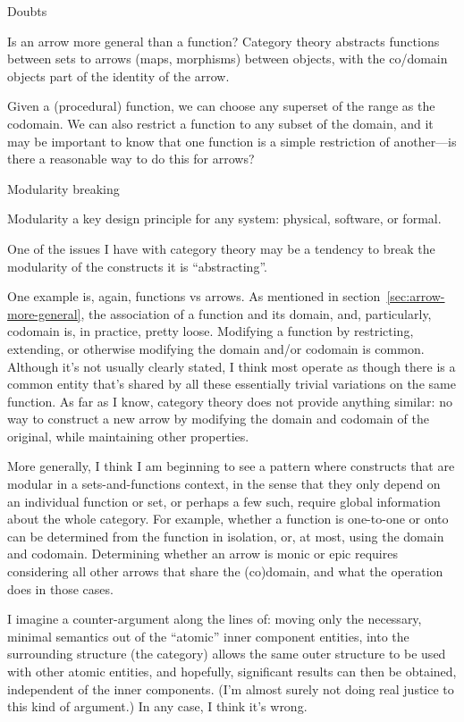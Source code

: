 \begin{plSection}{Doubts}
\begin{plSection}{Is an arrow more general than a function?}
Category theory abstracts functions between sets to
arrows (maps, morphisms) between objects,
with the co/domain objects part of the identity of the arrow.

Given a (procedural) function,
we can choose any superset of the range as the codomain.
We can also restrict a function to any subset of the domain,
and it may be important to know that one function is a simple 
restriction of another---is there a reasonable way to do this
for arrows?

\end{plSection}%
\begin{plSection}{Modularity breaking}
\label{sec:Modularity_breaking}

Modularity a key design principle for any system: physical, 
software, or formal.

One of the issues I have with category theory
may be a tendency to break the modularity of the constructs it is
``abstracting''.

One example is, again, functions vs arrows.
As mentioned in section~\ref{sec:arrow-more-general},
the association of a function and its domain, and, particularly,
codomain is, in practice, pretty loose.
Modifying a function by restricting, extending, or otherwise
modifying the domain and/or codomain is common.
Although it's not usually clearly stated, 
I think most operate as though there is a common entity
that's shared by all these essentially trivial variations on the
same function.
As far as I know, category theory does not provide anything similar:
no way to construct a new arrow by modifying the domain
and codomain of the original, while maintaining other properties.

More generally, I think I am beginning to see a pattern where
constructs that are modular in a sets-and-functions context,
in the sense that they only depend on an individual function or
set, or perhaps a few such, require global information about
the whole category.
For example, whether a function is one-to-one or onto
can be determined from the function in isolation,
or, at most, using the domain and codomain.
Determining whether an arrow is monic or epic requires
considering all other arrows that share the (co)domain,
and what the \compose operation does in those cases.

I imagine a counter-argument along the lines of:
moving only the necessary, minimal semantics out of the ``atomic''
inner component entities, 
into the surrounding structure (the category) allows the same 
outer structure to be used
with other atomic entities, and hopefully, significant results
can then be obtained, independent of the inner components.
(I'm almost surely not doing real justice to this kind of argument.)
In any case, I think it's wrong.


\end{plSection}
\end{plSection}
